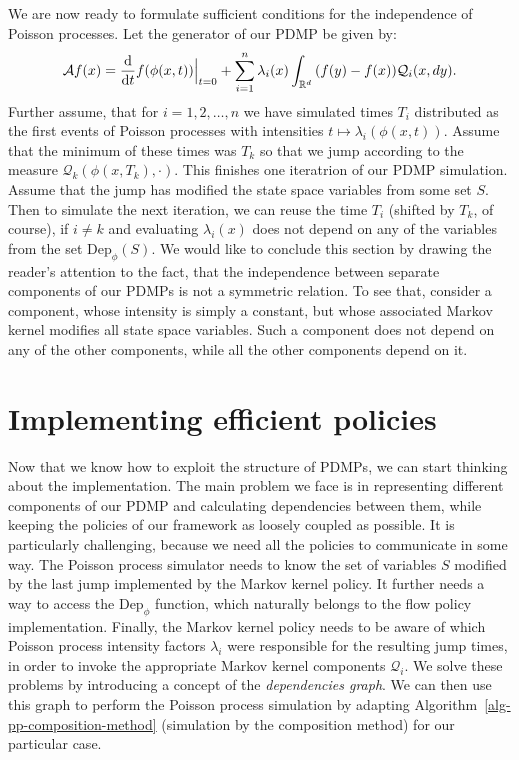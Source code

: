 \documentclass[report.tex]{subfiles}
\begin{document}
We are now ready to formulate sufficient conditions
for the independence of Poisson processes. Let the generator of our PDMP be given
by:
\begin{equation}
  \label{pdmp-generator-n-components}
  \mathcal{A}f(x) =
  \dv{}{t}f(\phi(x, t)) \Bigr|_{t = 0} +
  \sum_{i=1}^{n} \lambda_{i}(x)\int_{{\mathbb{R}^{d}}}^{{}} {}{(f(y) - f(x))\mathcal{Q}_{i}(x, dy)}.
\end{equation}
Further assume, that for $i = 1, 2, \dots, n$
we have simulated times $T_{i}$ distributed as the first events of Poisson processes
with intensities $t \mapsto \lambda_{i}(\phi(x, t))$.
Assume that the minimum of these times was $T_{k}$ so that we jump according
to the measure $\mathcal{Q}_{k}(\phi(x, T_{k}), \cdot)$.
This finishes one iteratrion of our PDMP simulation.
Assume that the jump has modified the state space variables from some set
$S$. Then to simulate the next iteration, we can reuse the time $T_{i}$ (shifted by $T_{k}$, of course),
if $i \neq k$ and evaluating $\lambda_{i}(x)$ does not depend on any of the variables from the
set $\text{Dep}_{\phi}(S)$. We would like to conclude this section by drawing the
reader's attention to the fact, that the independence between separate components
of our PDMPs is not a symmetric relation. To see that, consider a component, whose
intensity is simply a constant, but whose associated Markov kernel modifies all
state space variables. Such a component does not depend on any of the other components,
while all the other components depend on it.


\section{Implementing efficient policies}
\label{efficient-policies-implementation}

Now that we know how to exploit the structure of PDMPs, we can start thinking about
the implementation.
The main problem we face is in representing different components of our PDMP
and calculating dependencies between them, while keeping the policies of our
framework as loosely coupled as possible.
It is particularly challenging, because we need all the policies to communicate in some way.
The Poisson process simulator needs to know the set of variables $S$ modified by
the last jump implemented by the Markov kernel policy.
It further needs a way to access the $\text{Dep}_{\phi}$ function, which naturally
belongs to the flow policy implementation.
Finally, the Markov kernel policy needs to be aware of which Poisson process
intensity factors $\lambda_{i}$ were responsible for the resulting jump times, in order to invoke
the appropriate Markov kernel components $\mathcal{Q}_{i}$.
We solve these problems by introducing a concept of the \textit{dependencies graph}.
We can then use this graph to perform the Poisson process simulation by
adapting Algorithm~\ref{alg-pp-composition-method} (simulation by the composition method)
for our particular case.
\end{document}
